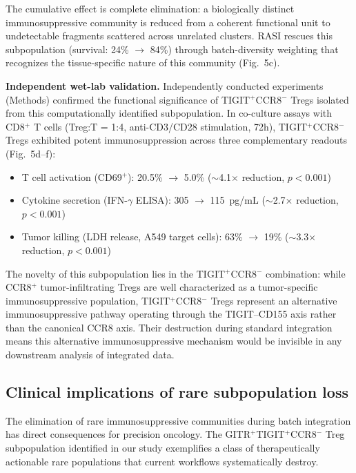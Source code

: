 The cumulative effect is complete elimination: a biologically distinct immunosuppressive community is reduced from a coherent functional unit to undetectable fragments scattered across unrelated clusters. RASI rescues this subpopulation (survival: 24\% $\to$ 84\%) through batch-diversity weighting that recognizes the tissue-specific nature of this community (Fig.~5c).

\textbf{Independent wet-lab validation.} Independently conducted experiments (Methods) confirmed the functional significance of TIGIT$^+$CCR8$^-$ Tregs isolated from this computationally identified subpopulation. In co-culture assays with CD8$^+$ T cells (Treg:T = 1:4, anti-CD3/CD28 stimulation, 72h), TIGIT$^+$CCR8$^-$ Tregs exhibited potent immunosuppression across three complementary readouts (Fig.~5d--f):
\begin{itemize}
    \item T cell activation (CD69$^+$): 20.5\% $\to$ 5.0\% ($\sim$4.1$\times$ reduction, $p<0.001$)
    \item Cytokine secretion (IFN-$\gamma$ ELISA): 305 $\to$ 115~pg/mL ($\sim$2.7$\times$ reduction, $p<0.001$)
    \item Tumor killing (LDH release, A549 target cells): 63\% $\to$ 19\% ($\sim$3.3$\times$ reduction, $p<0.001$)
\end{itemize}

The novelty of this subpopulation lies in the TIGIT$^+$CCR8$^-$ combination: while CCR8$^+$ tumor-infiltrating Tregs are well characterized as a tumor-specific immunosuppressive population\cite{declerck2018}, TIGIT$^+$CCR8$^-$ Tregs represent an alternative immunosuppressive pathway operating through the TIGIT--CD155 axis rather than the canonical CCR8 axis. Their destruction during standard integration means this alternative immunosuppressive mechanism would be invisible in any downstream analysis of integrated data.



\subsection*{Clinical implications of rare subpopulation loss}

The elimination of rare immunosuppressive communities during batch integration has direct consequences for precision oncology. The GITR$^+$TIGIT$^+$CCR8$^-$ Treg subpopulation identified in our study exemplifies a class of therapeutically actionable rare populations that current workflows systematically destroy.

